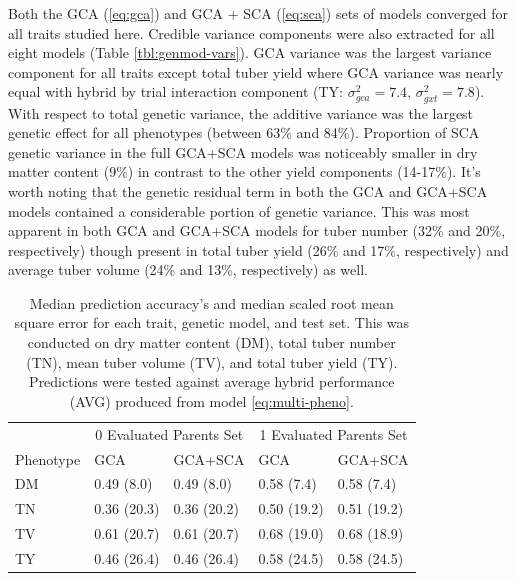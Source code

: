 Both the GCA (\ref{eq:gca}) and GCA + SCA (\ref{eq:sca}) sets of models converged for all traits studied here. Credible variance components were also extracted for all eight models (Table \ref{tbl:genmod-vars}). GCA variance was the largest variance component for all traits except total tuber yield where GCA variance was nearly equal with hybrid by trial interaction component (TY: \(\sigma^2_{gca}=7.4\), \(\sigma^2_{gxt}=7.8\)). With respect to total genetic variance, the additive variance was the largest genetic effect for all phenotypes (between 63\% and 84\%). Proportion of SCA genetic variance in the full GCA+SCA models was noticeably smaller in dry matter content (9\%) in contrast to the other yield components (14-17\%). It's worth noting that the genetic residual term in both the GCA and GCA+SCA models contained a considerable portion of genetic variance. This was most apparent in both GCA and GCA+SCA models for tuber number (32\% and 20\%, respectively) though present in total tuber yield (26\% and 17\%, respectively) and average tuber volume (24\% and 13\%, respectively) as well.


\begin{table}[H]
    \caption{Median prediction accuracy's and median scaled root mean square error for each trait, genetic model, and test set. This was conducted on dry matter content (DM), total tuber number (TN), mean tuber volume (TV), and total tuber yield (TY). Predictions were tested against average hybrid performance (AVG) produced from model \ref{eq:multi-pheno}.
 \label{tbl:pa}}
\begin{tabular}{lllll}
\toprule
\multicolumn{1}{c}{} & \multicolumn{2}{c}{0 Evaluated Parents Set} & \multicolumn{2}{c}{1 Evaluated Parents Set} \\
\cmidrule(l{3pt}r{3pt}){2-3} \cmidrule(l{3pt}r{3pt}){4-5}
Phenotype & GCA & GCA+SCA & GCA & GCA+SCA\\
\midrule
DM & 0.49 (8.0) & 0.49 (8.0) & 0.58 (7.4) & 0.58 (7.4)\\
TN & 0.36 (20.3) & 0.36 (20.2) & 0.50 (19.2) & 0.51 (19.2)\\
TV & 0.61 (20.7) & 0.61 (20.7) & 0.68 (19.0) & 0.68 (18.9)\\
TY & 0.46 (26.4) & 0.46 (26.4) & 0.58 (24.5) & 0.58 (24.5)\\
\bottomrule
\end{tabular}
\end{table}

